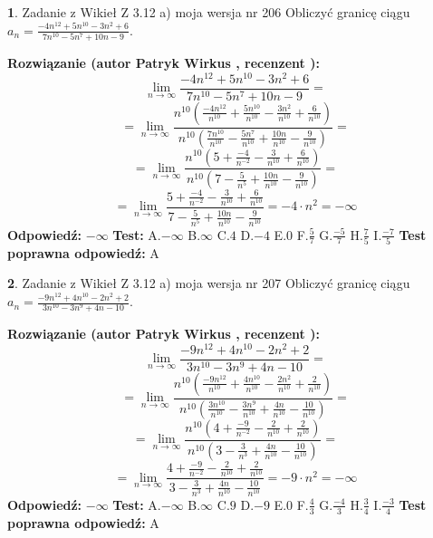 \documentclass[12pt, a4paper]{article}
\theoremstyle{definition} %
\newtheorem{zad}{}
\newcommand{\zadStart}[1]{\begin{zad}#1\newline}
\newcommand{\zadStop}{\end{zad}}
\newcommand{\rozwStart}[2]{\noindent \textbf{Rozwiązanie (autor #1 , recenzent #2): }\newline}
\newcommand{\rozwStop}{\newline}
\newcommand{\odpStart}{\noindent \textbf{Odpowiedź:}\newline}
\newcommand{\odpStop}{\newline}
\newcommand{\testStart}{\noindent \textbf{Test:}\newline}
\newcommand{\testStop}{\newline}
\newcommand{\kluczStart}{\noindent \textbf{Test poprawna odpowiedź:}\newline}
\newcommand{\kluczStop}{\newline}
\begin{document}
\zadStart{Zadanie z Wikieł Z 3.12 a) moja wersja nr 206}
Obliczyć granicę ciągu $a_{n}=\frac{-4n^{12}+5n^{10}-3n^{2}+6}{7n^{10}-5n^{7}+10n-9}$.
\zadStop
\rozwStart{Patryk Wirkus}{}
$$\lim\limits_{n\to\infty}\frac{-4n^{12}+5n^{10}-3n^{2}+6}{7n^{10}-5n^{7}+10n-9}=$$
$$=\lim\limits_{n\to\infty}\frac{n^{10}\left(\frac{-4n^{12}}{n^{10}}+\frac{5n^{10}}{n^{10}}-\frac{3n^{2}}{n^{10}}+\frac{6}{n^{10}}\right)}{n^{10}\left(\frac{7n^{10}}{n^{10}}-\frac{5n^{7}}{n^{10}}+\frac{10n}{n^{10}}-\frac{9}{n^{10}}\right)}=$$
$$=\lim\limits_{n\to\infty}\frac{n^{10}\left(5+\frac{-4}{n^{-2}}-\frac{3}{n^{10}}+\frac{6}{n^{10}}\right)}
{n^{10}\left(7-\frac{5}{n^{5}}+\frac{10n}{n^{10}}-\frac{9}{n^{10}}\right)}=$$
$$=\lim\limits_{n\to\infty}\frac{5+\frac{-4}{n^{-2}}-\frac{3}{n^{10}}+\frac{6}{n^{10}}}{7-\frac{5}{n^{5}}+\frac{10n}{n^{10}}-\frac{9}{n^{10}}}=-4\cdot n^{2} = -\infty$$
\rozwStop
\odpStart
$-\infty$
\odpStop
\testStart
A.$-\infty$
B.$\infty$
C.$4$
D.$-4$
E.$0$
F.$\frac{5}{7}$
G.$\frac{-5}{7}$
H.$\frac{7}{5}$
I.$\frac{-7}{5}$
\testStop
\kluczStart
A
\kluczStop



\zadStart{Zadanie z Wikieł Z 3.12 a) moja wersja nr 207}
Obliczyć granicę ciągu $a_{n}=\frac{-9n^{12}+4n^{10}-2n^{2}+2}{3n^{10}-3n^{9}+4n-10}$.
\zadStop
\rozwStart{Patryk Wirkus}{}
$$\lim\limits_{n\to\infty}\frac{-9n^{12}+4n^{10}-2n^{2}+2}{3n^{10}-3n^{9}+4n-10}=$$
$$=\lim\limits_{n\to\infty}\frac{n^{10}\left(\frac{-9n^{12}}{n^{10}}+\frac{4n^{10}}{n^{10}}-\frac{2n^{2}}{n^{10}}+\frac{2}{n^{10}}\right)}{n^{10}\left(\frac{3n^{10}}{n^{10}}-\frac{3n^{9}}{n^{10}}+\frac{4n}{n^{10}}-\frac{10}{n^{10}}\right)}=$$
$$=\lim\limits_{n\to\infty}\frac{n^{10}\left(4+\frac{-9}{n^{-2}}-\frac{2}{n^{10}}+\frac{2}{n^{10}}\right)}
{n^{10}\left(3-\frac{3}{n^{3}}+\frac{4n}{n^{10}}-\frac{10}{n^{10}}\right)}=$$
$$=\lim\limits_{n\to\infty}\frac{4+\frac{-9}{n^{-2}}-\frac{2}{n^{10}}+\frac{2}{n^{10}}}{3-\frac{3}{n^{3}}+\frac{4n}{n^{10}}-\frac{10}{n^{10}}}=-9\cdot n^{2} = -\infty$$
\rozwStop
\odpStart
$-\infty$
\odpStop
\testStart
A.$-\infty$
B.$\infty$
C.$9$
D.$-9$
E.$0$
F.$\frac{4}{3}$
G.$\frac{-4}{3}$
H.$\frac{3}{4}$
I.$\frac{-3}{4}$
\testStop
\kluczStart
A
\kluczStop
\end{document}
